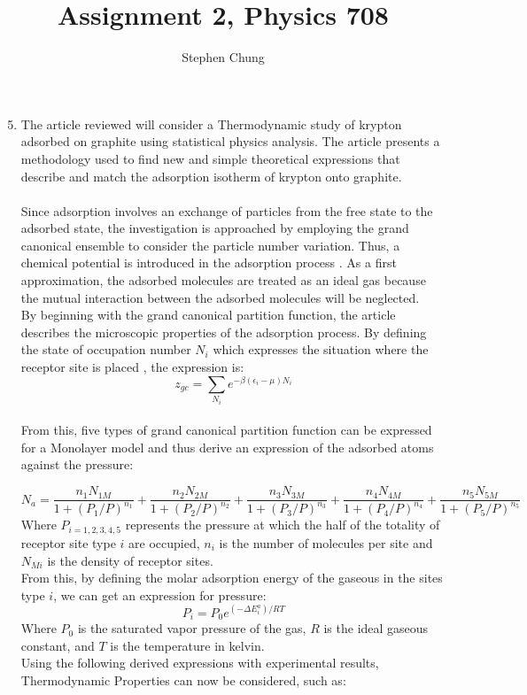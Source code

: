 \documentclass[12pt,a4paper]{article}
\begin{document}
	\title{Assignment 2, Physics 708}
	\author{Stephen Chung}
	\date{}
	\maketitle
		
\begin{enumerate}	
	\setcounter{enumi}{4}
    \item The article reviewed will consider a Thermodynamic study of krypton adsorbed on graphite using statistical physics analysis. The article presents a methodology used to find new and simple theoretical expressions that describe and match the adsorption isotherm of krypton onto graphite.\\
    \\
    Since adsorption involves an exchange of particles from the free state to the adsorbed state, the investigation is approached by employing the grand canonical ensemble to consider the particle number variation. Thus, a chemical potential is introduced in the adsorption process \cite{chem}. As a first approximation, the adsorbed molecules are treated as an ideal gas \cite{chem} because the mutual interaction between the adsorbed molecules will be neglected.\\
    By beginning with the grand canonical partition function, the article describes the microscopic properties of the adsorption process. By defining the state of occupation number $N_i$ which expresses the situation where the receptor site is placed \cite{theo,dye}, the expression is:
    \[z_{gc} = \sum\limits_{N_i}e^{-\beta(\epsilon_i-\mu)N_i}\]
    \\
    From this, five types of grand canonical partition function can be expressed for a Monolayer model and thus derive an expression of the adsorbed atoms against the pressure:
    
    \[N_a = \frac{n_1N_{1M}}{1+(P_1/P)^{n_1}} + \frac{n_2N_{2M}}{1+(P_2/P)^{n_2}} + \frac{n_3N_{3M}}{1+(P_3/P)^{n_3}} + \frac{n_4N_{4M}}{1+(P_4/P)^{n_4}} + \frac{n_5N_{5M}}{1+(P_5/P)^{n_5}}\]
	Where $P_{i = 1,2,3,4,5}$ represents the pressure at which the half of the totality of receptor site type $i$ are occupied, $n_i$ is the number of molecules per site and $N_{Mi}$ is the density of receptor sites.\\ From this, by defining the molar adsorption energy of the gaseous in the sites type $i$, we can get an expression for pressure:
	\[P_i = P_0e^{(-\Delta E_i^a)/RT}\]
	Where $P_0$ is the saturated vapor pressure of the gas, $R$ is the ideal gaseous constant, and $T$ is the temperature in kelvin.\\
	\newpage
	Using the following derived expressions with experimental results, Thermodynamic Properties can now be considered, such as:
	

\end{enumerate}
\end{document}
